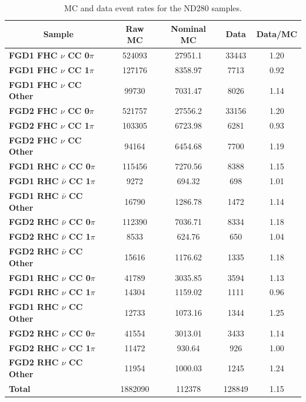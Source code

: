 \begin{center}
\begin{table}[!htbp]
\center
\begin{tabular}{l||c|c|c|c}
\hline \hline
\multicolumn{1}{c||}{\textbf{Sample}} & \textbf{Raw MC} & \textbf{Nominal MC} & \textbf{Data} & \textbf{Data/MC} \\
\hline
\hline
\textbf{FGD1 FHC $\nu$ CC 0$\pi$} & 524093 & 27951.1 & 33443 & 1.20 \\ 
\textbf{FGD1 FHC $\nu$ CC 1$\pi$} & 127176 & 8358.97 & 7713 & 0.92 \\ 
\textbf{FGD1 FHC $\nu$ CC Other} & 99730 & 7031.47 & 8026 & 1.14 \\ \hline
\textbf{FGD2 FHC $\nu$ CC 0$\pi$} & 521757 & 27556.2 & 33156 & 1.20 \\
\textbf{FGD2 FHC $\nu$ CC 1$\pi$} & 103305 & 6723.98 & 6281 & 0.93\\
\textbf{FGD2 FHC $\nu$ CC Other} & 94164 & 6454.68 & 7700 & 1.19 \\ \hline
\textbf{FGD1 RHC $\bar{\nu}$ CC 0$\pi$} & 115456 & 7270.56 & 8388 & 1.15\\
\textbf{FGD1 RHC $\bar{\nu}$ CC 1$\pi$} & 9272 & 694.32 & 698 & 1.01\\
\textbf{FGD1 RHC $\bar{\nu}$ CC Other} & 16790 & 1286.78 & 1472 & 1.14\\ \hline
\textbf{FGD2 RHC $\bar{\nu}$ CC 0$\pi$} & 112390 & 7036.71 & 8334 & 1.18\\
\textbf{FGD2 RHC $\bar{\nu}$ CC 1$\pi$} & 8533 & 624.76 & 650 & 1.04\\
\textbf{FGD2 RHC $\bar{\nu}$ CC Other} & 15616 & 1176.62 & 1335 & 1.18\\ \hline
\textbf{FGD1 RHC $\nu$ CC 0$\pi$} & 41789 & 3035.85 & 3594 & 1.13\\
\textbf{FGD1 RHC $\nu$ CC 1$\pi$} & 14304 & 1159.02 & 1111 & 0.96\\
\textbf{FGD1 RHC $\nu$ CC Other} & 12733 & 1073.16 & 1344 & 1.25\\ \hline
\textbf{FGD2 RHC $\nu$ CC 0$\pi$} & 41554 & 3013.01 & 3433 & 1.14\\
\textbf{FGD2 RHC $\nu$ CC 1$\pi$} & 11472 & 930.64 & 926 & 1.00\\ 
\textbf{FGD2 RHC $\nu$ CC Other} & 11954 & 1000.03 & 1245 & 1.24\\ \hline
\textbf{Total} & 1882090 & 112378 & 128849 & 1.15\\ \hline\hline
\end{tabular}
\caption{MC and data event rates for the ND280 samples.}
\label{tab:nomrates}
\end{table}
\end{center}
\vspace{-1cm}

